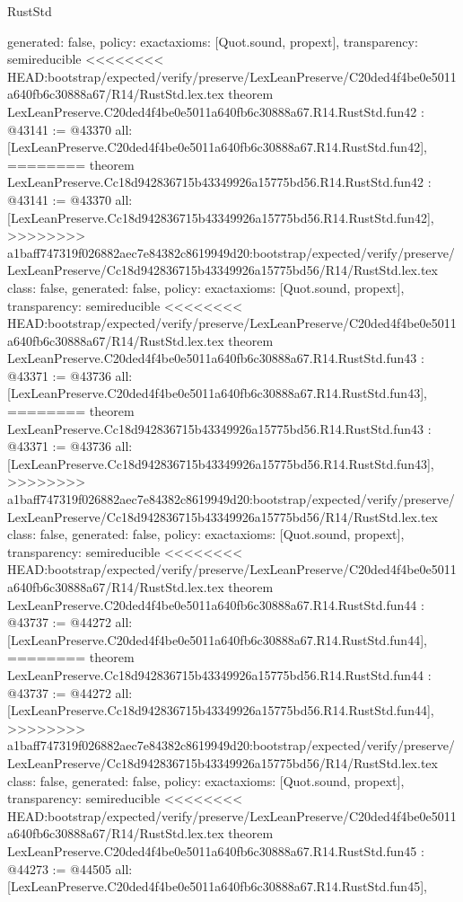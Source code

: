 \begin{lexlean}{RustStd}
\begin{coremodule}
{\begin{coremodule}
{{{{{{{{{{{{{{{{{{{{{{{{{{{{{{{{{{{{{{{{{{{{{  generated: false,
  policy: exact{axioms: [Quot.sound, propext]},
  transparency: semireducible
}
<<<<<<<< HEAD:bootstrap/expected/verify/preserve/LexLeanPreserve/C20ded4f4be0e5011a640fb6c30888a67/R14/RustStd.lex.tex
theorem LexLeanPreserve.C20ded4f4be0e5011a640fb6c30888a67.R14.RustStd.fun42 : @43141 := @43370 {
  all: [LexLeanPreserve.C20ded4f4be0e5011a640fb6c30888a67.R14.RustStd.fun42],
========
theorem LexLeanPreserve.Cc18d942836715b43349926a15775bd56.R14.RustStd.fun42 : @43141 := @43370 {
  all: [LexLeanPreserve.Cc18d942836715b43349926a15775bd56.R14.RustStd.fun42],
>>>>>>>> a1baff747319f026882aec7e84382c8619949d20:bootstrap/expected/verify/preserve/LexLeanPreserve/Cc18d942836715b43349926a15775bd56/R14/RustStd.lex.tex
  class: false,
  generated: false,
  policy: exact{axioms: [Quot.sound, propext]},
  transparency: semireducible
}
<<<<<<<< HEAD:bootstrap/expected/verify/preserve/LexLeanPreserve/C20ded4f4be0e5011a640fb6c30888a67/R14/RustStd.lex.tex
theorem LexLeanPreserve.C20ded4f4be0e5011a640fb6c30888a67.R14.RustStd.fun43 : @43371 := @43736 {
  all: [LexLeanPreserve.C20ded4f4be0e5011a640fb6c30888a67.R14.RustStd.fun43],
========
theorem LexLeanPreserve.Cc18d942836715b43349926a15775bd56.R14.RustStd.fun43 : @43371 := @43736 {
  all: [LexLeanPreserve.Cc18d942836715b43349926a15775bd56.R14.RustStd.fun43],
>>>>>>>> a1baff747319f026882aec7e84382c8619949d20:bootstrap/expected/verify/preserve/LexLeanPreserve/Cc18d942836715b43349926a15775bd56/R14/RustStd.lex.tex
  class: false,
  generated: false,
  policy: exact{axioms: [Quot.sound, propext]},
  transparency: semireducible
}
<<<<<<<< HEAD:bootstrap/expected/verify/preserve/LexLeanPreserve/C20ded4f4be0e5011a640fb6c30888a67/R14/RustStd.lex.tex
theorem LexLeanPreserve.C20ded4f4be0e5011a640fb6c30888a67.R14.RustStd.fun44 : @43737 := @44272 {
  all: [LexLeanPreserve.C20ded4f4be0e5011a640fb6c30888a67.R14.RustStd.fun44],
========
theorem LexLeanPreserve.Cc18d942836715b43349926a15775bd56.R14.RustStd.fun44 : @43737 := @44272 {
  all: [LexLeanPreserve.Cc18d942836715b43349926a15775bd56.R14.RustStd.fun44],
>>>>>>>> a1baff747319f026882aec7e84382c8619949d20:bootstrap/expected/verify/preserve/LexLeanPreserve/Cc18d942836715b43349926a15775bd56/R14/RustStd.lex.tex
  class: false,
  generated: false,
  policy: exact{axioms: [Quot.sound, propext]},
  transparency: semireducible
}
<<<<<<<< HEAD:bootstrap/expected/verify/preserve/LexLeanPreserve/C20ded4f4be0e5011a640fb6c30888a67/R14/RustStd.lex.tex
theorem LexLeanPreserve.C20ded4f4be0e5011a640fb6c30888a67.R14.RustStd.fun45 : @44273 := @44505 {
  all: [LexLeanPreserve.C20ded4f4be0e5011a640fb6c30888a67.R14.RustStd.fun45],
}}}}}}}}}}}}}}}}}}}}}}}}}}}}}}}}}}}}}}}}}}}}}}}}
\end{coremodule}}
\end{coremodule}
\end{lexlean}
